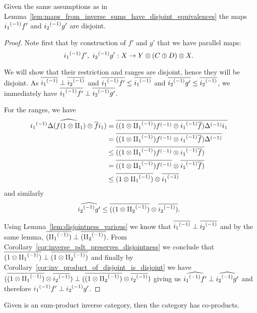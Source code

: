 \begin{lemma}\label{lem:inverse_sum_candidate_maps_are_disjoint}
  Given the same assumptions as in Lemma~\ref{lem:maps_from_inverse_sums_have_disjoint_equivalences}
  the maps ${i_1}^{(-1)}f'$ and ${i_2}^{(-1)}g'$ are disjoint.
\end{lemma}
\begin{proof}
  Note first that by construction of $f'$ and $g'$ that we have parallel maps:
  \[
    \inv{i_1}f',\ \inv{i_2}g': X \to Y\*(C\+D)\*X.
  \]

  We will show that their restriction and ranges are disjoint, hence they will be disjoint.
  As $\overline{{i_1}^{(-1)}} \perp \overline{{i_2}^{(-1)}}$ and $\overline{{i_1}^{(-1)}f'} \le \overline{{i_1}^{(-1)}}$ and
  $\overline{{i_2}^{(-1)}g'} \le \overline{{i_2}^{(-1)}}$, we immediately have
  $\overline{{i_1}^{(-1)}f'} \perp \overline{{i_2}^{(-1)}g'}$.

  For the ranges, we have
  \begin{align*}
    \widehat{{i_1}^{(-1)}\Delta  (f (1\otimes\amalg_{1})\otimes \overline{f}i_1)} &=
      \overline{((1\otimes{\amalg_{1}}^{(-1)}){f}^{(-1)} \otimes {i_1}^{(-1)}\overline{f}){\Delta}^{(-1)}i_1}\\
      &= \overline{((1\otimes{\amalg_{1}}^{(-1)}){f}^{(-1)} \otimes {i_1}^{(-1)}\overline{f}){\Delta}^{(-1)}}\\
      &\le \overline{((1\otimes{\amalg_{1}}^{(-1)}){f}^{(-1)} \otimes {i_1}^{(-1)}\overline{f})}\\
      &= \overline{((1\otimes{\amalg_{1}}^{(-1)}){f}^{(-1)}} \otimes \overline{{i_1}^{(-1)}\overline{f})}\\
      &\le \overline{(1\otimes{\amalg_{1}}^{(-1)})} \otimes \overline{{i_1}^{(-1)}}
  \end{align*}
  and similarly
  \[
     \widehat{{i_2}^{(-1)} g'} \le \overline{((1\otimes{\amalg_{2}}^{(-1)})} \otimes \overline{{i_2}^{(-1)})}.
  \]

  Using Lemma~\ref{lem:disjointness_various}
  we know that $\overline{{i_1}^{(-1)}} \perp \overline{{i_2}^{(-1)}}$ and by the same lemma,
  $\overline{({\amalg_{1}}^{(-1)})}\perp \overline{({\amalg_{2}}^{(-1)})}$. From
  Corollary~\ref{cor:inverse_pdt_preserves_disjointness}
  we conclude that $\overline{(1\otimes{\amalg_{1}}^{(-1)})}\perp \overline{(1\otimes{\amalg_{2}}^{(-1)})}$ and finally by
  Corollary~\ref{cor:inv_product_of_disjoint_is_disjoint} we have
  $(\overline{(1\otimes{\amalg_{1}}^{(-1)})}\otimes \overline{{i_2}^{(-1)}} )\perp (\overline{(1\otimes{\amalg_{2}}^{(-1)})} \otimes \overline{{i_2}^{(-1)}})$ giving us
  $\widehat{{i_1}^{(-1)}f'} \perp \widehat{{i_2}^{(-1)}g'}$ and therefore ${i_1}^{(-1)}f' \perp {i_2}^{(-1)}g'$.
\end{proof}
\begin{theorem}\label{thm:x_tilde_has_coproducts_if_x_is_sum_product_category}
  Given \X is an sum-product inverse category, then the category \Xt has co-products.
\end{theorem}
